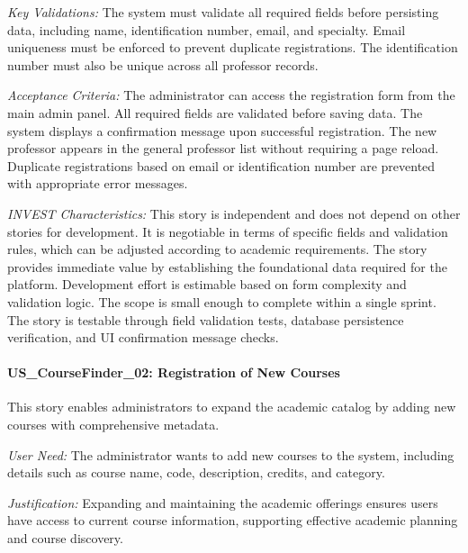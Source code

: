 \documentclass[12pt,a4paper]{article}
\begin{document}
\textit{Key Validations:} The system must validate all required fields before persisting data, including name, identification number, email, and specialty. Email uniqueness must be enforced to prevent duplicate registrations. The identification number must also be unique across all professor records.\newline

\textit{Acceptance Criteria:} The administrator can access the registration form from the main admin panel. All required fields are validated before saving data. The system displays a confirmation message upon successful registration. The new professor appears in the general professor list without requiring a page reload. Duplicate registrations based on email or identification number are prevented with appropriate error messages.\newline

\textit{INVEST Characteristics:} This story is independent and does not depend on other stories for development. It is negotiable in terms of specific fields and validation rules, which can be adjusted according to academic requirements. The story provides immediate value by establishing the foundational data required for the platform. Development effort is estimable based on form complexity and validation logic. The scope is small enough to complete within a single sprint. The story is testable through field validation tests, database persistence verification, and UI confirmation message checks.\newline

\paragraph{US\_CourseFinder\_02: Registration of New Courses}

This story enables administrators to expand the academic catalog by adding new courses with comprehensive metadata.\newline

\textit{User Need:} The administrator wants to add new courses to the system, including details such as course name, code, description, credits, and category.\newline

\textit{Justification:} Expanding and maintaining the academic offerings ensures users have access to current course information, supporting effective academic planning and course discovery.\newline
\end{document}
